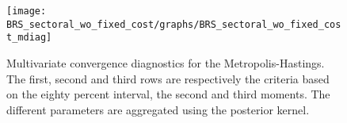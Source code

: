  
\begin{figure}[H]
\centering 
\texttt{[image: BRS\_sectoral\_wo\_fixed\_cost/graphs/BRS\_sectoral\_wo\_fixed\_cost\_mdiag]}
\caption{Multivariate convergence diagnostics for the Metropolis-Hastings.
The first, second and third rows are respectively the criteria based on
the eighty percent interval, the second and third moments. The different 
parameters are aggregated using the posterior kernel.}\label{Fig:MultivariateDiagnostics}
\end{figure}

